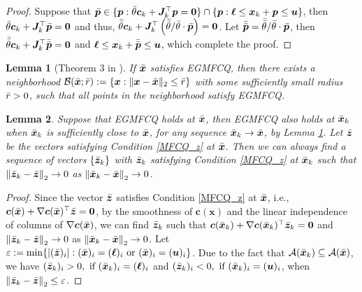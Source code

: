 \documentclass[aos]{imsart}
\numberwithin{equation}{section}
\theoremstyle{plain}
\newtheorem{lemma}{Lemma}
\begin{document}
\begin{appendix}
\begin{proof}
    Suppose that $\Bar{\bm{p}} \in \{\bm{p}: \Bar{\theta} \bm{c}_k +  \bm{J}_k^{\top} \bm{p} = \bm{0}\} \cap \{\bm{p}: \bm{\ell} \leq \bm{x}_k + \bm{p} \leq \bm{u}\}$, then $\Bar{\theta} \bm{c}_k +  \bm{J}_k^{\top} \Bar{\bm{p}}  = \bm{0}$ and thus, $\Bar{\Bar{\theta}} \bm{c}_k +  \bm{J}_k^{\top} \left(\Bar{\Bar{\theta}} /\Bar{\theta} \cdot \Bar{\bm{p}}\right)  = \bm{0}$. Let $\Bar{\Bar{\bm{p}}} = \Bar{\Bar{\theta}} /\Bar{\theta} \cdot \Bar{\bm{p}}$, then $\Bar{\Bar{\theta}} \bm{c}_k +  \bm{J}_k^{\top} \Bar{\Bar{\bm{p}}}  = \bm{0}$ and $\bm{\ell} \leq \bm{x}_k + \Bar{\Bar{\bm{p}}} \leq \bm{u}$, which complete the proof.
\end{proof}


\begin{lemma}
[Theorem 3 in \cite{robinson1976stability}]
\label{prop_MFCQ_neighborhood}
    If $\Bar{\bm{x}}$ satisfies EGMFCQ, then there exists a neighborhood $\mathcal{B}(\Bar{\bm{x}};\Bar{r}):= \{\bm{x}: \|\bm{x}- \Bar{\bm{x}}\|_2 \leq \Bar{r}\}$ with some sufficiently small radius $\Bar{r}>0$, such that all points in the neighborhood satisfy EGMFCQ. 
\end{lemma}


\begin{lemma}
\label{prop_continuity_z}
    Suppose that EGMFCQ holds at $\Bar{\bm{x}}$, then EGMFCQ also holds at $\Bar{\bm{x}}_{k}$ when $\Bar{\bm{x}}_{k}$ is sufficiently close to $\Bar{\bm{x}}$, for any sequence $\Bar{\bm{x}}_{k} \to \Bar{\bm{x}}$, by Lemma \ref{prop_MFCQ_neighborhood}. Let $\Bar{\bm{z}}$ be the vectors satisfying Condition \eqref{MFCQ_z} at $\Bar{\bm{x}}$. Then we can always find a sequence of vectors $\{\Bar{\bm{z}}_{k}\}$ with $\Bar{\bm{z}}_{k}$ satisfying Condition \eqref{MFCQ_z} at $\Bar{\bm{x}}_{k}$ such that
    $\left\| \Bar{\bm{z}}_{k} - \Bar{\bm{z}} \right\|_2 \to 0$ as $\left\| \Bar{\bm{x}}_{k} - \Bar{\bm{x}} \right\|_2 \to 0$. 
\end{lemma}


\begin{proof}
    Since the vector $\Bar{\bm{z}}$ satisfies Condition \eqref{MFCQ_z} at $\Bar{\bm{x}}$, i.e., $\bm{c}(\Bar{\bm{x}}) + \nabla \bm{c}(\Bar{\bm{x}})^{\top} \Bar{\bm{z}} = \bm{0}$, by the smoothness of $\bm{c}(\bm{x})$ and the linear independence of columns of $\nabla \bm{c}(\Bar{\bm{x}})$, we can find $\Bar{\bm{z}}_{k}$ such that $\bm{c}(\Bar{\bm{x}}_{k}) + \nabla \bm{c}(\Bar{\bm{x}}_{k})^{\top} \Bar{\bm{z}}_{k} = \bm{0}$ and  $\left\| \Bar{\bm{z}}_{k} - \Bar{\bm{z}}  \right\|_2 \to 0$ as $\left\| \Bar{\bm{x}}_{k}  - \Bar{\bm{x}}  \right\|_2 \to 0$. Let $\varepsilon := \min \{|(\Bar{\bm{z}})_i|: (\Bar{\bm{x}})_{i} = (\bm{\ell})_i~\text{or}~(\Bar{\bm{x}})_{i} = (\bm{u})_i\}$. Due to the fact that $\mathcal{A}(\Bar{\bm{x}}_{k}) \subseteq \mathcal{A}(\Bar{\bm{x}})$, we have $(\Bar{\bm{z}}_{k})_i >0,~\text{if}~(\Bar{\bm{x}}_{k})_{i} = (\bm{\ell})_i$ and $(\Bar{\bm{z}}_{k})_i < 0,~\text{if}~(\Bar{\bm{x}}_{k})_{i} = (\bm{u})_i$, when $\left\| \Bar{\bm{z}}_{k} - \Bar{\bm{z}} \right\|_2 \leq \varepsilon$. 
    

\end{proof}
\end{appendix}
\end{document}
